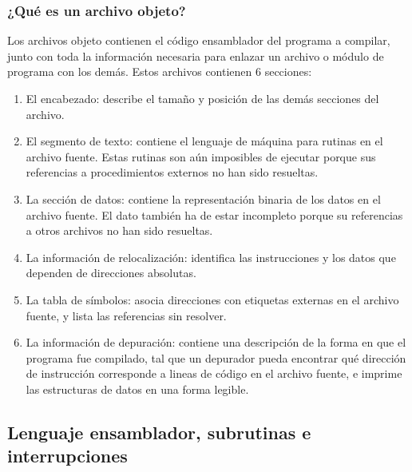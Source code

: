 \documentclass[twocolumn]{IEEEtran}
\begin{document}
\subsubsection{¿Qué es un archivo objeto?}
\noindent
Los archivos objeto contienen el código ensamblador del programa a compilar, junto con toda la información necesaria para enlazar un archivo o módulo de programa con los demás. Estos archivos contienen 6 secciones:
\begin{enumerate}
 \item El encabezado: describe el tamaño y posición de las demás secciones del archivo.
 \item El segmento de texto: contiene el lenguaje de máquina para rutinas en el archivo fuente. Estas rutinas son aún imposibles de ejecutar porque sus referencias a procedimientos externos no han sido resueltas.
 \item La sección de datos: contiene la representación binaria de los datos en el archivo fuente. El dato también ha de estar incompleto porque su referencias a otros archivos no han sido resueltas.
 \item La información de relocalización: identifica las instrucciones y los datos que dependen de direcciones absolutas.
 \item La tabla de símbolos: asocia direcciones con etiquetas externas en el archivo fuente, y lista las referencias sin resolver.
 \item La información de depuración: contiene una descripción de la forma en que el programa fue compilado, tal que un depurador pueda encontrar qué dirección de instrucción corresponde a lineas de código en el archivo fuente, e imprime las estructuras de datos en una forma legible.
\end{enumerate}

\subsection{Lenguaje ensamblador, subrutinas e interrupciones}
\end{document}
